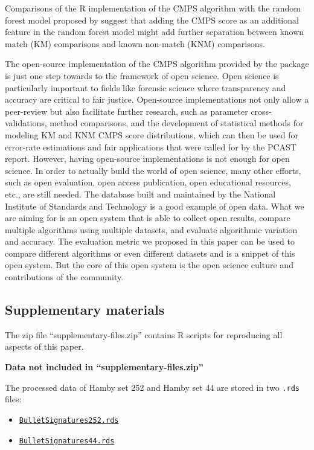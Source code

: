 Comparisons of the R implementation of the CMPS algorithm with the
random forest model proposed by \citet{aoas} suggest that adding the
CMPS score as an additional feature in the random forest model might add
further separation between known match (KM) comparisons and known
non-match (KNM) comparisons.

The open-source implementation of the CMPS algorithm provided by the
 package is just one step towards to the framework of open
science. Open science is particularly important to fields like forensic
science where transparency and accuracy are critical to fair justice.
Open-source implementations not only allow a peer-review but also
facilitate further research, such as parameter cross-validations, method
comparisons, and the development of statistical methods for modeling KM
and KNM CMPS score distributions, which can then be used for error-rate
estimations and fair applications that were called for by the PCAST
\citep{pcast} report. However, having open-source implementations is not
enough for open science. In order to actually build the world of open
science, many other efforts, such as open evaluation, open access
publication, open educational resources, etc., are still needed. The
database built and maintained by the National Institute of Standards and
Technology is a good example of open data. What we are aiming for is an
open system that is able to collect open results, compare multiple
algorithms using multiple datasets, and evaluate algorithmic variation
and accuracy. The evaluation metric we proposed in this paper can be
used to compare different algorithms or even different datasets and is a
snippet of this open system. But the core of this open system is the
open science culture and contributions of the community.

\hypertarget{supplementary-materials}{%
\subsection{Supplementary materials}\label{supplementary-materials}}

The zip file ``supplementary-files.zip'' contains R scripts for
reproducing all aspects of this paper.

\textbf{Data not included in ``supplementary-files.zip''}

The processed data of Hamby set 252 and Hamby set 44 are stored in two
\texttt{.rds} files:

\begin{itemize}
\tightlist
\item
  \href{https://github.com/willju-wangqian/CMPSpaper/blob/main/reproducible/bullet_signatures_etc/BulletSignatures252.rds}{\texttt{BulletSignatures252.rds}}
\item
  \href{https://github.com/willju-wangqian/CMPSpaper/blob/main/reproducible/bullet_signatures_etc/BulletSignatures44.rds}{\texttt{BulletSignatures44.rds}}
\end{itemize}

